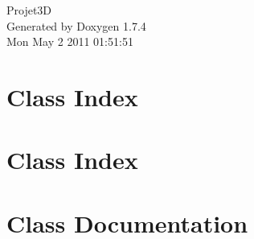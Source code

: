 \documentclass[a4paper]{book}
\begin{document}
\hypersetup{pageanchor=false}
\begin{titlepage}
\vspace*{7cm}
\begin{center}
{\Large Projet3D }\\
\vspace*{1cm}
{\large Generated by Doxygen 1.7.4}\\
\vspace*{0.5cm}
{\small Mon May 2 2011 01:51:51}\\
\end{center}
\end{titlepage}
\clearemptydoublepage
{}
\tableofcontents
\clearemptydoublepage
{}
\hypersetup{pageanchor=true}
\chapter{Class Index}

\chapter{Class Index}

\chapter{Class Documentation}

























\printindex
\end{document}
